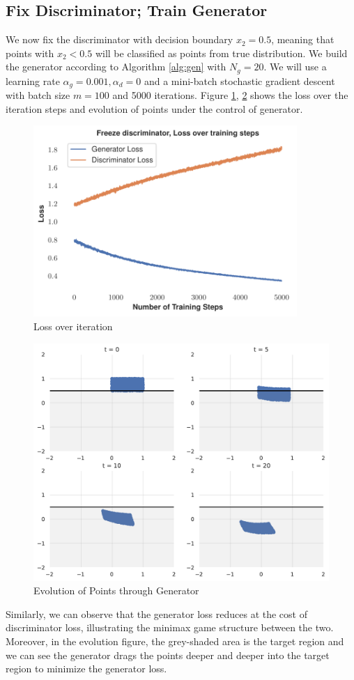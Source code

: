 \subsection{Fix Discriminator; Train Generator}
\label{sec: 2}
We now fix the discriminator with decision boundary $x_2 = 0.5$, meaning that points with $x_2 < 0.5$ will be classified as points from true distribution. We build the generator according to Algorithm \ref{alg:gen} with $N_g = 20$. We will use a learning rate $\alpha_g = 0.001, \alpha_d = 0$ and a mini-batch stochastic gradient descent with batch size $m = 100$ and 5000 iterations.
Figure \ref{fig:freeze_disc}, \ref{fig:distri_disc} shows the loss over the iteration steps and evolution of points under the control of generator.
\begin{figure}[H]
    \centering
    \includegraphics[width= 10cm]{Freeze_discriminater.pdf}
    \caption{Loss over iteration}
    \label{fig:freeze_disc}
\end{figure}
\begin{figure}[H]
    \centering
    \includegraphics[width = 13cm]{Evo_2.pdf}
    \caption{Evolution of Points through Generator}
    \label{fig:distri_disc}
\end{figure}
Similarly, we can observe that the generator loss reduces at the cost of discriminator loss, illustrating the minimax game structure between the two. Moreover, in the evolution figure, the grey-shaded area is the target region and we can see the generator drags the points deeper and deeper into the target region to minimize the generator loss.
